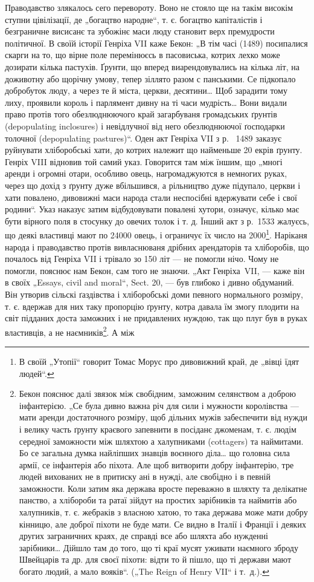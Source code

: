 Праводавство злякалось сего перевороту. Воно не стояло ще на такім високім ступни цівілізації, де
„богацтво народне“, т. є. богацтво капіталістів і безграничне висисанє та зубожінє маси люду
становит верх премудрости
політичної. В своїй історії Генріха VII каже Бекон: „В тім часі (1489) посипалися скарги на то, що
вірне поле перемінюєсь в пасовиська, котрих лехко може дозирати кілька пастухів. Ґрунти, що вперед
виарендовувались на кілька літ, на доживотну або щорічну умову, тепер зіллято разом
с панськими. Се підкопало добробуток люду, а через те й міста, церкви, десятини\dots{} Щоб зарадити
тому лиху, проявили король і парлямент дивну на ті часи мудрість\dots{} Вони видали право протів того
обезлюднюючого край загарбуваня громадських ґрунтів (depopulating inclosures) і невідлучної
від него обезлюднюючої ґосподарки толочної (depopulating pastures)“. Оден акт Генріха VII з р.~
1489 заказує руйнувати хліборобські хати, до котрих належит що найменьше 20 екрів ґрунту. Генріх
VIII відновив той самий указ. Говорится там між їншим, що „многі аренди і огромні отари, особливо
овець, нагромаджуются в немногих руках, через що дохід
з ґрунту дуже вбільшився, а рільництво дуже підупало, церкви і хати повалено, дивовижні маси народа
стали неспосібні вдержувати себе і свої родини“. Указ наказує затим відбудовувати повалені хутори,
означує, кілько має бути вірного поля в стосунку до овечих толок і т. д. Їнший акт з р.~1533
жалуєсь, що деякі властивці мают по \num{24000} овець, і ограничує їх число на 2000\footnote{
В своїй „Утопії“ говорит Томас Морус про дивовижний край, де
„вівці їдят людей“.
}. Наріканя народа і
праводавство протів вивласнюваня дрібних арендаторів та хліборобів, що почалось від Генріха VII і
трівало зо 150 літ
— не помогли нічо. Чому не помогли, пояснює нам Бекон, сам того не знаючи. „Акт Генріха~VII, — каже
він в своїх „Essays, civil and moral“, Sect. 20, — був глибоко і дивно обдуманий. Він утворив
сільскі ґаздівства і хліборобські доми певного нормального розміру, т. є. вдержав для них таку
пропорцію ґрунту, котра давала їм змогу плодити на світ підданих доста заможних і не придавлених
нуждою, так що плуг був в руках властивців, а не наємників\footnote{
Бекон пояснює далі звязок між свобідним, заможним селянством
а доброю інфантерією. „Се була дивно важна річ для сили і мужности
королівства — мати аренди достаточного розміру, щоб дільних мужів
забеспечити від нужди і велику часть ґрунту краєвого запевнити в посіданє джоменам, т. є. людім
середної заможности між шляхтою а халупниками (cottagers) та наймитами. Бо се загальна думка
найліпших знавців воєнного діла\dots{} що головна сила армії, се інфантерія або піхота. Але щоб
витворити добру інфантерію, тре людей вихованих не в притиску ані в нужді, але свобідно і в певній
заможности. Коли затим яка держава вросте переважно в шляхту та делікатне панство, а хлібороби та
ратаї зійдут на простих зарібників та наймитів або халупників, т. є. жебраків з власною хатою, то
така держава може мати добру кінницю, але доброї піхоти не буде мати. Се видно в Італії і Франції і
деяких других заграничних краях, де справді все або шляхта або нужденні зарібники\dots{} Дійшло там до
того, що ті краї мусят уживати наємного зброду Швейцарів та др. для своєї піхоти: відти то й пішло,
що ті держави мают богато людий, а мало вояків“. („The Reign of Henry VII“ і т.~д.).
}. А між
\parbreak{}
